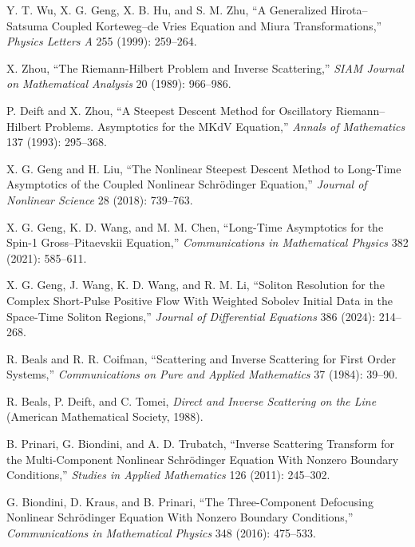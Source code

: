 \begin{enumerate}[label={[\arabic*]},leftmargin=2.8em]
\item{}\label{ref:original9} Y. T. Wu, X. G. Geng, X. B. Hu, and S. M. Zhu, ``A Generalized Hirota--Satsuma Coupled Korteweg--de Vries Equation and Miura Transformations,'' \emph{Physics Letters A} 255 (1999): 259--264.
\item X. Zhou, ``The Riemann-Hilbert Problem and Inverse Scattering,'' \emph{SIAM Journal on Mathematical Analysis} 20 (1989): 966--986.
\item P. Deift and X. Zhou, ``A Steepest Descent Method for Oscillatory Riemann--Hilbert Problems. Asymptotics for the MKdV Equation,'' \emph{Annals of Mathematics} 137 (1993): 295--368.
\item X. G. Geng and H. Liu, ``The Nonlinear Steepest Descent Method to Long-Time Asymptotics of the Coupled Nonlinear Schrödinger Equation,'' \emph{Journal of Nonlinear Science} 28 (2018): 739--763.
\item X. G. Geng, K. D. Wang, and M. M. Chen, ``Long-Time Asymptotics for the Spin-1 Gross--Pitaevskii Equation,'' \emph{Communications in Mathematical Physics} 382 (2021): 585--611.
\item X. G. Geng, J. Wang, K. D. Wang, and R. M. Li, ``Soliton Resolution for the Complex Short-Pulse Positive Flow With Weighted Sobolev Initial Data in the Space-Time Soliton Regions,'' \emph{Journal of Differential Equations} 386 (2024): 214--268.
\item R. Beals and R. R. Coifman, ``Scattering and Inverse Scattering for First Order Systems,'' \emph{Communications on Pure and Applied Mathematics} 37 (1984): 39--90.
\item R. Beals, P. Deift, and C. Tomei, \emph{Direct and Inverse Scattering on the Line} (American Mathematical Society, 1988).
\item B. Prinari, G. Biondini, and A. D. Trubatch, ``Inverse Scattering Transform for the Multi-Component Nonlinear Schrödinger Equation With Nonzero Boundary Conditions,'' \emph{Studies in Applied Mathematics} 126 (2011): 245--302.
\item G. Biondini, D. Kraus, and B. Prinari, ``The Three-Component Defocusing Nonlinear Schrödinger Equation With Nonzero Boundary Conditions,'' \emph{Communications in Mathematical Physics} 348 (2016): 475--533.

\end{enumerate}
